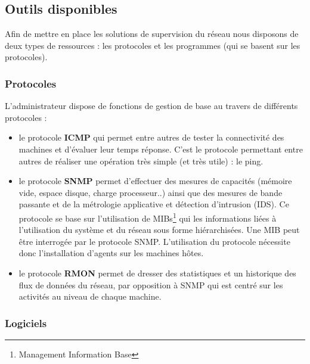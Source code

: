 \documentclass[a4paper]{article}
\begin{document}
\subsection{Outils disponibles}

Afin de mettre en place les solutions de supervision du réseau nous disposons de deux types de ressources : les protocoles et les programmes (qui se basent sur les protocoles).\\ 

\subsubsection{Protocoles}

L'administrateur dispose de fonctions de gestion de base au travers de différents protocoles :
\begin{itemize}
\item le protocole \textbf{ICMP} qui permet entre autres de tester la connectivité des machines et d'évaluer leur temps réponse. C'est le protocole permettant entre autres de réaliser une opération très simple (et très utile) : le ping. 
\item le protocole \textbf{SNMP} permet d'effectuer des mesures de capacités (mémoire vide, espace disque, charge processeur..) ainsi que des mesures de bande passante et de la métrologie applicative et détection d'intrusion (IDS). Ce protocole se base sur l'utilisation de MIBs\footnote{Management Information Base} qui les informations liées à l'utilisation du système et du réseau sous forme hiérarchisées. Une MIB peut être interrogée par le protocole SNMP. L'utilisation du protocole nécessite donc l'installation d'agents sur les machines hôtes.
\item le protocole \textbf{RMON} permet de dresser des statistiques et un historique des flux de données du réseau, par opposition à SNMP qui est centré sur les activités au niveau de chaque machine.
\end{itemize}

\subsubsection{Logiciels}
\end{document}
